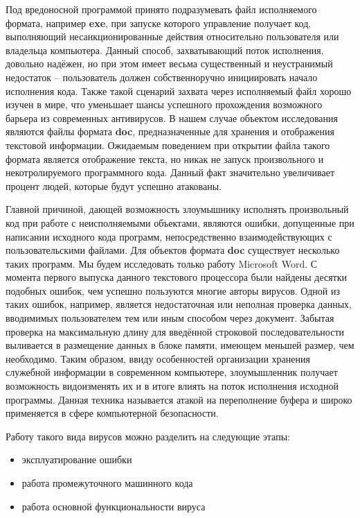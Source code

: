 Под вредоносной программой принято подразумевать файл исполняемого формата, например \textbf{exe}, при запуске которого управление получает код, выполняющий несанкционированные действия относительно пользователя или владельца компьютера. 
Данный способ, захватывающий поток исполнения, довольно надёжен, но при этом имеет весьма существенный и неустранимый недостаток -- пользователь должен собственноручно инициировать начало исполнения кода.
Также такой сценарий захвата через исполняемый файл хорошо изучен в мире, что уменьшает шансы успешного прохождения возможного барьера из современных антивирусов.
В нашем случае объектом исследования являются файлы формата \textbf{doc}, предназначенные для хранения и отображения текстовой информации. 
Ожидаемым поведением при открытии файла такого формата является отображение текста, но никак не запуск произвольного и некотролируемого программного кода.
Данный факт значительно увеличивает процент людей, которые будут успешно атакованы.

Главной причиной, дающей возможность злоумышнику исполнять произвольный код при работе с неисполняемыми объектами, являются ошибки, допущенные при написании исходного кода программ, непосредственно взаимодействующих с пользовательскими файлами. 
Для объектов формата \textbf{doc} существует несколько таких программ.
Мы будем исследовать только работу Microsoft Word.
С момента первого выпуска данного текстового процессора были найдены десятки подобных ошибок, чем успешно пользуются многие авторы вирусов.
Одной из таких ошибок, например, является недостаточная или неполная проверка данных, вводимимых пользователем тем или иным способом через документ.
Забытая проверка на максимальную длину для введённой строковой последовательности выливается в размещение данных в блоке памяти, имеющем меньшей размер, чем необходимо. 
Таким образом, ввиду особенностей организации хранения служебной информации в современном компьютере, злоумышленник получает возможность видоизменять их и в итоге влиять на поток исполнения исходной программы.
Данная техника называется атакой на переполнение буфера и широко применяется в сфере компьютерной безопасности.

Работу такого вида вирусов можно разделить на следующие этапы:

\begin{itemize}
\item эксплуатирование ошибки
\item работа промежуточного машинного кода
\item работа основной функциональности вируса
\end{itemize}

